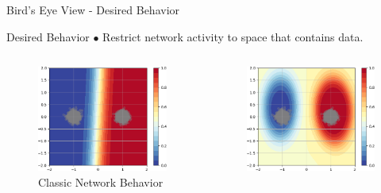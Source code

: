 \documentclass{beamer}
\begin{document}
\begin{frame}{Bird's Eye View - Desired Behavior}
    
    \begin{block}{Desired Behavior}
    $\bullet$ Restrict network activity to space that contains data.
    \end{block}
    
    \begin{columns}
    \begin{column}{.45\textwidth}
    \begin{figure}
        \includegraphics[width=\textwidth]{images/Bird's Eye View/classic_with_data.png}
        \caption*{Classic Network Behavior}
    \end{figure}
    \end{column}
    \begin{column}{.45\textwidth}
    \begin{figure}
        \includegraphics[width=\textwidth]{images/Bird's Eye View/fgn_with_data.png}

\end{figure}
\end{column}
\end{columns}
\end{frame}
\end{document}
